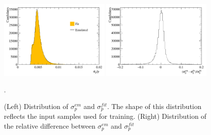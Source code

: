 \begin{figure}[h!]
\centering
\includegraphics[width=0.48\textwidth]{figs/ep.pdf}
\includegraphics[width=0.48\textwidth]{figs/difference.pdf}
\caption{(Left) Distribution of $\sigma^{em}_{p}$ and
  $\sigma^{fit}_{p}$. The shape of this distribution reflects the
  input samples used for training. (Right) Distribution of the relative difference between $\sigma^{em}_{p}$ and
  $\sigma^{fit}_{p}$  }.
\label{fig:diff}
\end{figure}

